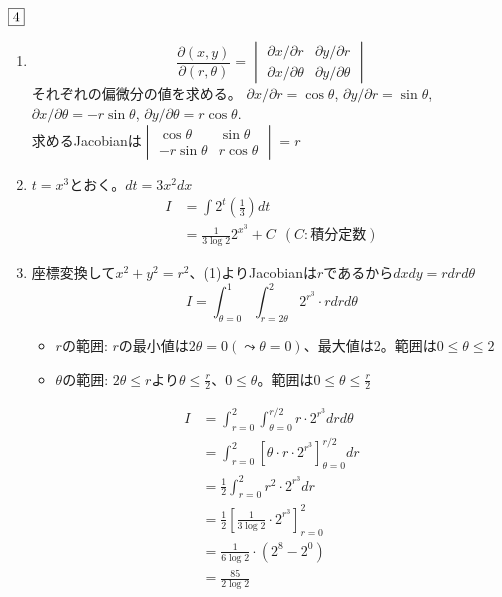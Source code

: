 \begin{souanswer} %
	$\fbox{4}$
\begin{enumerate}
	\item 
\begin{equation*}
	\frac{\partial (x, y)}{\partial (r, \theta)}= \begin{vmatrix}{\partial x}/{\partial r}& {\partial y}/{\partial r}\\ {\partial x}/{\partial \theta}& {\partial y}/{\partial \theta}\end{vmatrix}
\end{equation*}
	それぞれの偏微分の値を求める。
	${\partial x}/{\partial r}= \cos{\theta}$, 
	${\partial y}/{\partial r}= \sin{\theta}$, 
	${\partial x}/{\partial \theta}= -r\sin{\theta}$, 
	${\partial y}/{\partial \theta}= r\cos{\theta}$.\\
	求めるJacobianは$\begin{vmatrix}\cos{\theta}& \sin{\theta}\\ -r\sin{\theta}& r\cos{\theta}\end{vmatrix}= r$

	\item $t= x^3$とおく。$dt= 3x^2 dx$
\begin{align*}
	I
	&= \int 2^t \left(\frac{1}{3}\right) dt\\
	&= \frac{1}{3\log{2}} 2^{x^3}+ C\ \ (C:積分定数)
\end{align*}

	\item 座標変換して$x^2+ y^2= r^2$、(1)よりJacobianは$r$であるから$dxdy= r drd\theta$
\begin{equation*}
	I= \int_{\theta= 0}^1 \int_{r= 2\theta}^2 2^{r^3}\cdot rdrd\theta
\end{equation*}

\begin{tcolorbox}
\begin{itemize}
	\item $r$の範囲: $r$の最小値は$2\theta= 0(\leadsto \theta= 0)$、最大値は2。範囲は$0\le \theta\le 2$
	\item $\theta$の範囲: $2\theta\le r$より$\theta\le \frac{r}{2}$、$0\le \theta$。範囲は$0\le \theta\le \frac{r}{2}$
\end{itemize}
\end{tcolorbox}
\begin{align*}
	I
	&= \int_{r= 0}^2\int_{\theta= 0}^{r/2} r\cdot 2^{r^3}drd\theta\\
	&= \int_{r= 0}^2\left[\theta\cdot r\cdot 2^{r^3}\right]_{\theta= 0}^{r/2}dr\\
	&= \frac{1}{2}\int_{r= 0}^2 r^2\cdot 2^{r^3}dr\\
	&= \frac{1}{2}\left[\frac{1}{3\log{2}}\cdot 2^{r^3}\right]_{r= 0}^2\\
	&= \frac{1}{6\log{2}}\cdot (2^8- 2^0)\\
	&= \frac{85}{2\log{2}}
\end{align*}
\end{enumerate}
\end{souanswer}